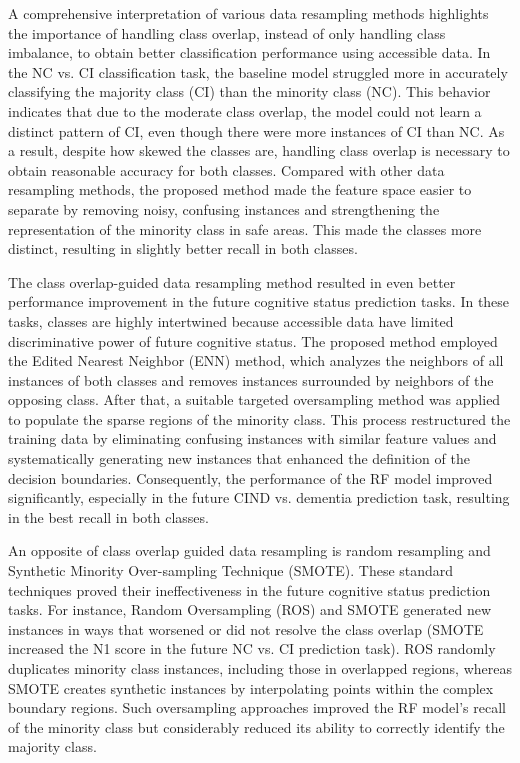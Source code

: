 A comprehensive interpretation of various data resampling methods highlights the importance of handling class overlap, instead of only handling class imbalance, to obtain better classification performance using accessible data. In the NC vs. CI classification task, the baseline model struggled more in accurately classifying the majority class (CI) than the minority class (NC). This behavior indicates that due to the moderate class overlap, the model could not learn a distinct pattern of CI, even though there were more instances of CI than NC. As a result, despite how skewed the classes are, handling class overlap is necessary to obtain reasonable accuracy for both classes. Compared with other data resampling methods, the proposed method made the feature space easier to separate by removing noisy, confusing instances and strengthening the representation of the minority class in safe areas. This made the classes more distinct, resulting in slightly better recall in both classes.

The class overlap-guided data resampling method resulted in even better performance improvement in the future cognitive status prediction tasks. In these tasks, classes are highly intertwined because accessible data have limited discriminative power of future cognitive status. The proposed method employed the Edited Nearest Neighbor (\acrshort{ENN}) method, which analyzes the neighbors of all instances of both classes and removes instances surrounded by neighbors of the opposing class. After that, a suitable targeted oversampling method was applied to populate the sparse regions of the minority class. This process restructured the training data by eliminating confusing instances with similar feature values and systematically generating new instances that enhanced the definition of the decision boundaries. Consequently, the performance of the RF model improved significantly, especially in the future CIND vs. dementia prediction task, resulting in the best recall in both classes.

An opposite of class overlap guided data resampling is random resampling and Synthetic Minority Over-sampling Technique (\acrshort{SMOTE}). These standard techniques proved their ineffectiveness in the future cognitive status prediction tasks. For instance, Random Oversampling (\acrshort{ROS}) and SMOTE generated new instances in ways that worsened or did not resolve the class overlap (SMOTE increased the N1 score in the future NC vs. CI prediction task). ROS randomly duplicates minority class instances, including those in overlapped regions, whereas SMOTE creates synthetic instances by interpolating points within the complex boundary regions. Such oversampling approaches improved the RF model's recall of the minority class but considerably reduced its ability to correctly identify the majority class.


